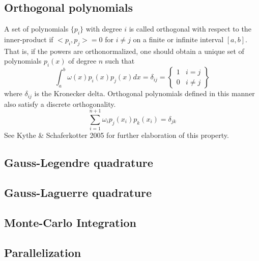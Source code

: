 \documentclass[%
reprint,
amsmath,amssymb,
aps,
]{revtex4-1}
\begin{document}
\subsection{Orthogonal polynomials} \noindent 
A set of polynomials $\{p_i\}$ with degree $i$ is called orthogonal with respect to the inner-product if $<p_i, p_j> = 0$ for $i\not = j$ on a finite or infinite interval $[a,b]$. That is, if the powers are orthonormalized, one should obtain a unique set of polynomials $p_i(x)$ of degree $n$ such that
\begin{equation}
	\int_{a}^{b} \omega(x)p_i(x)p_j(x)dx = \delta_{ij} = \left\{
	\begin{array}{ll}
	1 & i = j\\
	0 & i \not =j 
	\end{array} \right\}
\end{equation}
where $\delta_{ij}$ is the Kronecker delta. Orthogonal polynomials defined in this manner also satisfy a discrete orthogonality. 
\begin{equation}
	\sum_{i=1}^{n+1} \omega_i p_j(x_i)p_k(x_i) = \delta_{jk}
\end{equation}
See Kythe \& Schaferkotter 2005 for further elaboration of this property. 

\subsection{Gauss-Legendre quadrature}
\subsection{Gauss-Laguerre quadrature}
\subsection{Monte-Carlo Integration}
\subsection{Parallelization}
\end{document}
